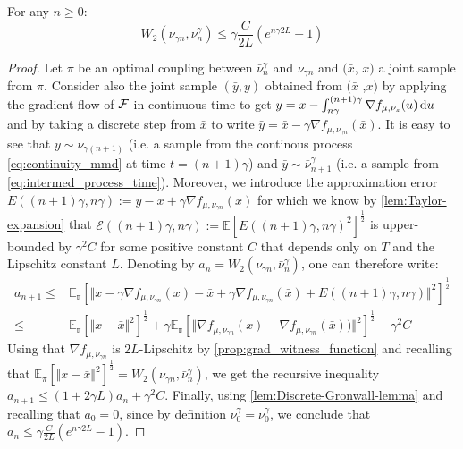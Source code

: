 \begin{lemma}\label{lem:euler_error_1}
For any $n\geq0$:
\begin{equation*}
W_{2}(\nu_{\gamma n},\bar{\nu}_{n}^{\gamma})\le\gamma\frac{C}{2L}(e^{n\gamma 2L}-1)
\end{equation*}
\end{lemma}
\begin{proof}
Let $\pi$ be an optimal coupling between $\bar{\nu}_{n}^{\gamma}$
and $\nu_{\gamma n}$ and  $(\bar{x}$, $x)$ a joint sample
from $\pi$. Consider also the joint sample $(\bar{y},y)$ obtained from  $(\bar{x}$ ,$x)$ by applying the gradient flow of ${{\mathcal F}}$ in continuous time to get $y=x-\int_{n\gamma}^{(n+1)\gamma}\nabla f_{\mu,\nu_{s}}(u)\mathop{}\!\mathrm{d} u$ and by taking a discrete step from $\bar{x}$ to write $\bar{y}=\bar{x}-\gamma\nabla f_{\mu,\nu_{\gamma n}}(\bar{x})$. It is easy to see that $y\sim\nu_{\gamma(n+1)}$ (i.e. a sample from the continous process \eqref{eq:continuity_mmd} at time $t=(n+1)\gamma$) and $\bar{y}\sim\bar{\nu}_{n+1}^{\gamma}$ (i.e. a sample from \eqref{eq:intermed_process_time}). Moreover, we introduce the approximation error $E((n+1)\gamma,n\gamma):=y-x+\gamma\nabla f_{\mu,\nu_{\gamma n}}(x)$ for which we know by \cref{lem:Taylor-expansion} that $\mathcal{E}((n+1)\gamma,n\gamma):=\mathbb{E}[E((n+1)\gamma,n\gamma)^2]^{\frac{1}{2}}$ is upper-bounded by $\gamma^{2}C$ for some positive constant $C$ that depends only on $T$ and the Lipschitz constant $L$. Denoting by $a_{n}=W_{2}(\nu_{\gamma n},\bar{\nu}_{n}^{\gamma})$, one can therefore write:
\begin{align*}
a_{n+1}\leq & \mathbb{E_{\pi}}\left[\Vert x-\gamma\nabla f_{\mu,\nu_{\gamma n}}(x)-\bar{x}+\gamma\nabla f_{\mu,\nu_{\gamma n}}(\bar{x})+E((n+1)\gamma,n\gamma)\Vert^{2}\right]^{\frac{1}{2}}\\
\leq & \mathbb{E_{\pi}}\left[\Vert x-\bar{x}\Vert^{2}\right]^{\frac{1}{2}}+\gamma\mathbb{E_{\pi}}\left[\Vert\nabla f_{\mu,\nu_{\gamma n}}(x)-\nabla f_{\mu,\nu_{\gamma n}}(\bar{x}))\Vert^{2}\right]^{\frac{1}{2}}+\gamma^{2}C
\end{align*}
Using that $\nabla f_{\mu,\nu_{\gamma n}}$ is $2L$-Lipschitz by \cref{prop:grad_witness_function} and
recalling that $\mathbb{E}_{\pi}\left[\Vert x-\bar{x}\Vert^{2}\right]^{\frac{1}{2}}=W_{2}(\nu_{\gamma n},\bar{\nu}_{n}^{\gamma})$, we get the recursive inequality $a_{n+1}\leq(1+2 \gamma L)a_{n}+\gamma^{2}C$. Finally, 
using \cref{lem:Discrete-Gronwall-lemma} and recalling that $a_{0}=0$, since by
definition $\bar{\nu}_{0}^{\gamma}=\nu_{0}^{\gamma}$, we conclude that $a_{n}\leq\gamma\frac{C}{2L}(e^{n\gamma 2L}-1)$.
\end{proof}
